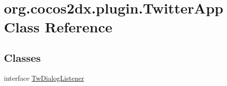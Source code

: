 \hypertarget{classorg_1_1cocos2dx_1_1plugin_1_1TwitterApp}{}\section{org.\+cocos2dx.\+plugin.\+Twitter\+App Class Reference}
\label{classorg_1_1cocos2dx_1_1plugin_1_1TwitterApp}
\subsection*{Classes}
\begin{DoxyCompactItemize}
\item 
interface \hyperlink{interfaceorg_1_1cocos2dx_1_1plugin_1_1TwitterApp_1_1TwDialogListener}{Tw\+Dialog\+Listener}
\end{DoxyCompactItemize}
